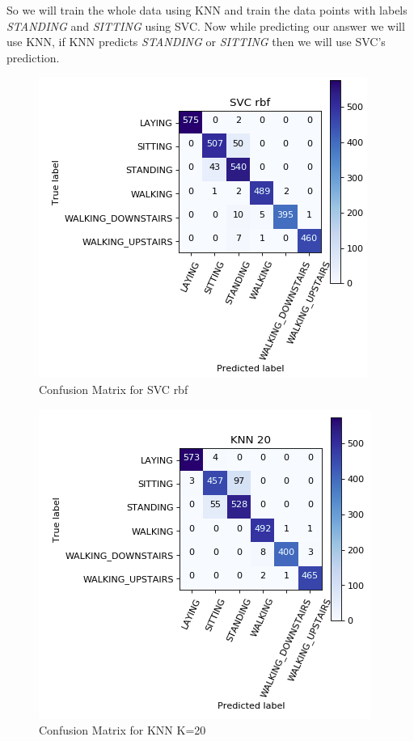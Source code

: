\documentclass[12pt]{article}
\begin{document}
So we will train the whole data using KNN and train the data points with labels \textit{STANDING} and \textit{SITTING} using SVC. Now while predicting our answer we will use KNN, if KNN predicts \textit{STANDING} or \textit{SITTING} then we will use SVC's prediction.
\newpage
\begin{figure}[H]
	\centering
	\includegraphics[scale=0.450]{svc.png}
	\caption{Confusion Matrix for SVC rbf}
\end{figure}
\begin{figure}[H]
	\centering
	\includegraphics[scale=0.450]{knn.png}
	\caption{Confusion Matrix for KNN K=20}
\end{figure}
\end{document}
